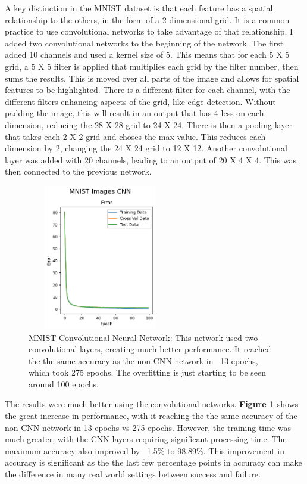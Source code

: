 \documentclass[letterpaper]{article} %
\begin{document}
A key distinction in the MNIST dataset is that each feature has a spatial relationship to the others, in the form of a 2 dimensional grid.  It is a common practice to use convolutional networks to take advantage of that relationship.  I added two convolutional networks to the beginning of the network.  The first added 10 channels and used a kernel size of 5.  This means that for each 5 X 5 grid, a 5 X 5 filter is applied that multiplies each grid by the filter number, then sums the results.  This is moved over all parts of the image and allows for spatial features to be highlighted.  There is a different filter for each channel, with the different filters enhancing aspects of the grid, like edge detection.  Without padding the image, this will result in an output that has 4 less on each dimension, reducing the 28 X 28 grid to 24 X 24.   There is then a pooling layer that takes each 2 X 2 grid and choses the max value.  This reduces each dimension by 2, changing the 24 X 24 grid to 12 X 12.  Another convolutional layer was added with 20 channels, leading to an output of 20 X 4 X 4.  This was then connected to the previous network.

\begin{figure}[h]
\centering
\includegraphics[width=2.5in, height=2.5in]{figures/MNIST_Images_CNN_Error_MNIST.png}
\caption{MNIST Convolutional Neural Network:  This network used two convolutional layers, creating much better performance.  It reached the the same accuracy as the non CNN network in ~13 epochs, which took 275 epochs.  The overfitting is just starting to be seen around 100 epochs. }
\label{fig:MNIST_Error_MNIST_cnn}
\end{figure}

The results were much better using the convolutional networks.  \textbf{Figure \ref{fig:MNIST_Error_MNIST_cnn}} shows the great increase in performance, with it reaching the the same accuracy of the non CNN network in 13 epochs vs 275 epochs.  However, the training time was much greater, with the CNN layers requiring significant processing time. The maximum accuracy also improved by ~1.5\% to 98.89\%.  This improvement in accuracy is significant as the the last few percentage points in accuracy can make the difference in many real world settings between success and failure. 
\end{document}
